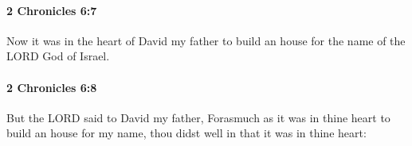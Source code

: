 		\paragraph{2 Chronicles 6:7} %
			\label{2CHRONICLES-6-7}

			Now it was in the heart of David my father to build an house for the name of the LORD God of Israel.


		\paragraph{2 Chronicles 6:8} %
			\label{2CHRONICLES-6-8}

			But the LORD said to David my father, Forasmuch as it was in thine heart to build an house for my name, thou didst well in that it was in thine heart:


